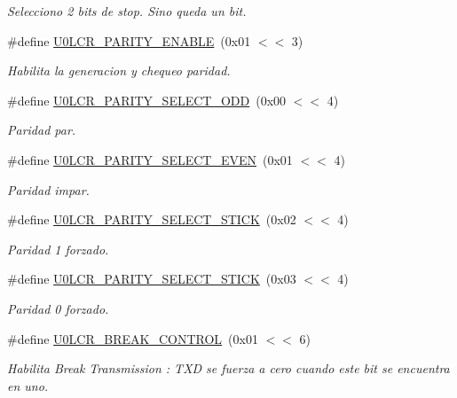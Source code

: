 \begin{DoxyCompactItemize}
\begin{DoxyCompactList}\small\item\em Selecciono 2 bits de stop. Sino queda un bit. \end{DoxyCompactList}\item 
\#define \hyperlink{group___l_c_r_b_i_t_s_ga7e31bc47be1ba3671357efd929e2b733}{U0\+L\+C\+R\+\_\+\+P\+A\+R\+I\+T\+Y\+\_\+\+E\+N\+A\+B\+LE}~(0x01 $<$$<$ 3)
\begin{DoxyCompactList}\small\item\em Habilita la generacion y chequeo paridad. \end{DoxyCompactList}\item 
\#define \hyperlink{group___l_c_r_b_i_t_s_ga216d11e84d54db2b62eba03dbd40a740}{U0\+L\+C\+R\+\_\+\+P\+A\+R\+I\+T\+Y\+\_\+\+S\+E\+L\+E\+C\+T\+\_\+\+O\+DD}~(0x00 $<$$<$ 4)
\begin{DoxyCompactList}\small\item\em Paridad par. \end{DoxyCompactList}\item 
\#define \hyperlink{group___l_c_r_b_i_t_s_ga01cafa504c142a81109a3a5105ba8ed5}{U0\+L\+C\+R\+\_\+\+P\+A\+R\+I\+T\+Y\+\_\+\+S\+E\+L\+E\+C\+T\+\_\+\+E\+V\+EN}~(0x01 $<$$<$ 4)
\begin{DoxyCompactList}\small\item\em Paridad impar. \end{DoxyCompactList}\item 
\#define \hyperlink{group___l_c_r_b_i_t_s_ga11f193765cc61579da49734fb03f45ae}{U0\+L\+C\+R\+\_\+\+P\+A\+R\+I\+T\+Y\+\_\+\+S\+E\+L\+E\+C\+T\+\_\+S\+T\+I\+CK}~(0x02 $<$$<$ 4)
\begin{DoxyCompactList}\small\item\em Paridad 1 forzado. \end{DoxyCompactList}\item 
\#define \hyperlink{group___l_c_r_b_i_t_s_gac59a010ca333a7dab781e89bc467b3c8}{U0\+L\+C\+R\+\_\+\+P\+A\+R\+I\+T\+Y\+\_\+\+S\+E\+L\+E\+C\+T\+\_\+S\+T\+I\+CK}~(0x03 $<$$<$ 4)
\begin{DoxyCompactList}\small\item\em Paridad 0 forzado. \end{DoxyCompactList}\item 
\#define \hyperlink{group___l_c_r_b_i_t_s_ga4f480d22c82a1322076a77e69c79924a}{U0\+L\+C\+R\+\_\+\+B\+R\+E\+A\+K\+\_\+\+C\+O\+N\+T\+R\+OL}~(0x01 $<$$<$ 6)
\begin{DoxyCompactList}\small\item\em Habilita Break Transmission \+: T\+XD se fuerza a cero cuando este bit se encuentra en uno. \end{DoxyCompactList}\item 

\end{DoxyCompactItemize}
